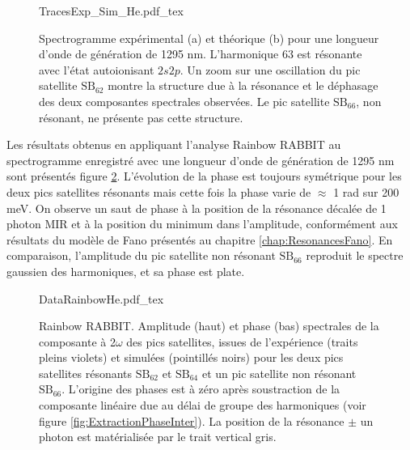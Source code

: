\begin{figure}
\centering
\def\svgwidth{\textwidth}
{TracesExp_Sim_He.pdf_tex}
\caption{Spectrogramme expérimental (a) et théorique (b) pour une longueur d'onde de génération de 1295 nm. L'harmonique 63 est résonante avec l'état autoionisant $2s2p$. Un zoom sur une oscillation du pic satellite $\text{SB}_{62}$ montre la structure due à la résonance et le déphasage des deux composantes spectrales observées. Le pic satellite $\text{SB}_{66}$, non résonant, ne présente pas cette structure.}
\label{fig:TracesExp_Sim_He}
\end{figure}

Les résultats obtenus en appliquant l'analyse Rainbow RABBIT au spectrogramme enregistré avec une longueur d'onde de génération de 1295 nm sont présentés figure \ref{fig:DataRainbowHe}. L'évolution de la phase est toujours symétrique pour les deux pics satellites résonants mais cette fois la phase varie de $\approx$ 1 rad sur 200 meV. On observe un saut de phase à la position de la résonance décalée de 1 photon MIR et à la position du minimum dans l'amplitude, conformément aux résultats du modèle de Fano présentés au chapitre \ref{chap:ResonancesFano}. En comparaison, l'amplitude du pic satellite non résonant $\text{SB}_{66}$ reproduit le spectre gaussien des harmoniques, et sa phase est plate.

\begin{figure}
\centering
\def\svgwidth{\textwidth}
{DataRainbowHe.pdf_tex}
\caption{Rainbow RABBIT. Amplitude (haut) et phase (bas) spectrales de la composante à 2$\omega$ des pics satellites, issues de l'expérience (traits pleins violets) et simulées (pointillés noirs) pour les deux pics satellites résonants $\text{SB}_{62}$ et $\text{SB}_{64}$ et un pic satellite non résonant $\text{SB}_{66}$. L'origine des phases est à zéro après soustraction de la composante linéaire due au délai de groupe des harmoniques (voir figure \ref{fig:ExtractionPhaseInter}). La position de la résonance $\pm$ un photon est matérialisée par le trait vertical gris.} 
\label{fig:DataRainbowHe}
\end{figure}

